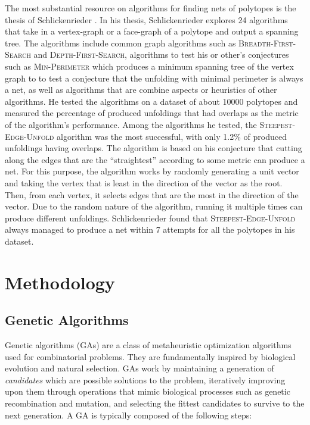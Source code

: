 \documentclass[conference]{IEEEtran}
\begin{document}
The most substantial resource on algorithms for finding nets of polytopes is the thesis of Schlickenrieder \cite{schlickenriederNetsPolyhedra}. In his thesis, Schlickenrieder explores 24 algorithms that take in a vertex-graph or a face-graph of a polytope and output a spanning tree. The algorithms include common graph algorithms such as \textsc{Breadth-First-Search} and \textsc{Depth-First-Search}, algorithms to test his or other's conjectures such as \textsc{Min-Perimeter} which produces a minimum spanning tree of the vertex graph to to test a conjecture that the unfolding with minimal perimeter is always a net, as well as algorithms that are combine aspects or heuristics of other algorithms. He tested the algorithms on a dataset of about 10000 polytopes and measured the percentage of produced unfoldings that had overlaps as the metric of the algorithm's performance. Among the algorithms he tested, the \textsc{Steepest-Edge-Unfold} algorithm was the most successful, with only 1.2\% of produced unfoldings having overlaps. The algorithm is based on his conjecture that cutting along the edges that are the ``straightest'' according to some metric can produce a net. For this purpose, the algorithm works by randomly generating a unit vector and taking the vertex that is least in the direction of the vector as the root. Then, from each vertex, it selects edges that are the most in the direction of the vector. Due to the random nature of the algorithm, running it multiple times can produce different unfoldings. Schlickenrieder found that \textsc{Steepest-Edge-Unfold} always managed to produce a net within 7 attempts for all the polytopes in his dataset.  

\section{Methodology}

\subsection{Genetic Algorithms}

Genetic algorithms (GAs) are a class of metaheuristic optimization algorithms used for combinatorial problems. They are fundamentally inspired by biological evolution and natural selection. GAs work by maintaining a generation of \emph{candidates} which are possible solutions to the problem, iteratively improving upon them through operations that mimic biological processes such as genetic recombination and mutation, and selecting the fittest candidates to survive to the next generation. A GA is typically composed of the following steps:
\end{document}
